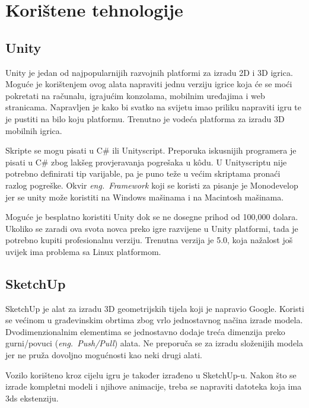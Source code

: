 \section{Korištene tehnologije}
\subsection{Unity}
Unity je jedan od najpopularnijih razvojnih platformi za izradu 2D i 3D igrica. Moguće je korištenjem ovog alata napraviti jednu verziju igrice koja će se moći pokretati na računalu, igrajućim konzolama, mobilnim uređajima i web stranicama. Napravljen je kako bi svatko na svijetu imao priliku napraviti igru te je pustiti na bilo koju platformu. Trenutno je vodeća platforma za izradu 3D mobilnih igrica.

Skripte se mogu pisati u C\# ili Unityscript. Preporuka iskusnijih programera je pisati u C\# zbog lakšeg provjeravanja pogrešaka u k\^odu. U Unityscriptu nije potrebno definirati tip varijable, pa je puno teže u većim skriptama pronaći razlog pogreške. Okvir \emph{eng.~Framework} koji se koristi za pisanje je Monodevelop jer se unity može koristiti na Windows mašinama i na Macintosh mašinama. 

Moguće je besplatno koristiti Unity dok se ne dosegne prihod od 100,000 dolara. Ukoliko se zaradi ova svota novca preko igre razvijene u Unity platformi, tada je potrebno kupiti profesionalnu verziju. Trenutna verzija je 5.0, koja nažalost još uvijek ima problema sa Linux platformom.

\subsection{SketchUp}
SketchUp je alat za izradu 3D geometrijskih tijela koji je napravio Google. Koristi se većinom u građevinskim obrtima zbog vrlo jednostavnog načina izrade modela. Dvodimenzionalnim elementima se jednostavno dodaje treća dimenzija preko gurni/povuci (\emph{eng.~Push/Pull}) alata. Ne preporuča se za izradu složenijih modela jer ne pruža dovoljno mogućnosti kao neki drugi alati. 

Vozilo korišteno kroz cijelu igru je također izrađeno u SketchUp-u. Nakon što se izrade kompletni modeli i njihove animacije, treba se napraviti datoteka koja ima 3ds ekstenziju.

